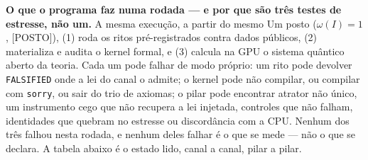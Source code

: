 \textbf{O que o programa faz numa rodada --- e por que são três testes de estresse, não um.} A mesma execução, a partir do mesmo Um posto ($\omega(I)=1$, \textsf{[POSTO]}), (1) roda os ritos pré-registrados contra dados públicos, (2) materializa e audita o kernel formal, e (3) calcula na GPU o sistema quântico aberto da teoria. Cada um pode falhar de modo próprio: um rito pode devolver \texttt{FALSIFIED} onde a lei do canal o admite; o kernel pode não compilar, ou compilar com \texttt{sorry}, ou sair do trio de axiomas; o pilar pode encontrar atrator não único, um instrumento cego que não recupera a lei injetada, controles que não falham, identidades que quebram no estresse ou discordância com a CPU. Nenhum dos três falhou nesta rodada, e nenhum deles falhar é o que se mede --- não o que se declara. A tabela abaixo é o estado lido, canal a canal, pilar a pilar.

